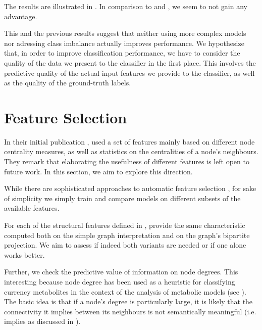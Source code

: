 \documentclass[
	fontsize=10pt, %
	twoside=false, %
	secnumdepth=1, %
  toc=indentunnumbered %
]{kaobook}
\begin{document}
The results are illustrated in . In comparison to
 and
, we seem to not gain any advantage.

This and the previous results suggest that neither using more complex models nor
adressing class imbalance actually improves performance. We hypothesize that, in
order to improve classification performance, we have to consider the quality of
the data we present to the classifier in the first place. This involves the
predictive quality of the actual input features we provide to the classifier, as
well as the quality of the ground-truth labels.





\section{Feature Selection}
\label{sec:feature-selection}


In their initial publication \cite{nielsen_MachineLearningSupport_2019},
\nielsen used a set of features mainly based on different node centrality
measures, as well as statistics on the centralities of a node's neighbours. They
remark that elaborating the usefulness of different features is left open to
future work. In this section, we aim to explore this direction.

While there are sophisticated approaches to automatic feature selection  
\cite{saeys_ReviewFeatureSelection_2007},
for sake of simplicity we simply train and compare models on different subsets
of the available features.

For each of the structural features defined in ,
\nielsen provide the same characteristic computed both on the simple graph
interpretation and on the graph's bipartite projection. We aim to assess if
indeed both variants are needed or if one alone works better.

Further, we check the predictive value of information on node degrees.
This interesting because node degree has been used as a heuristic for
classifying currency metabolites in the context of the analysis of metabolic
models (see ). The basic idea is that if a node's
degree is particularly large, it is likely that the connectivity it implies
between its neighbours is not semantically meaningful (i.e. implies  as discussed in ).
\end{document}
